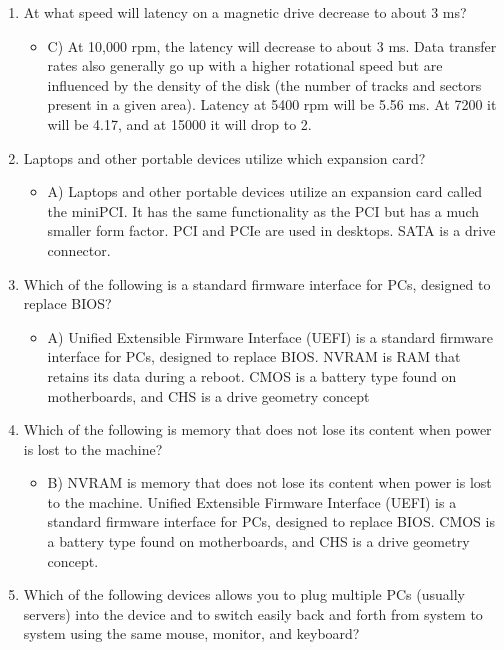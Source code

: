 \documentclass{article}
\begin{document}
\begin{enumerate}
\begin{itemize}
    \end{itemize}
    \item At what speed will latency on a magnetic drive decrease to about 3 ms?
    \begin{itemize}
        \item C) At 10,000 rpm, the latency will decrease to about 3 ms. Data transfer rates also generally go up with a higher rotational speed but are influenced by the density of the disk (the number of tracks and sectors present in a given area). Latency at 5400 rpm will be  5.56 ms. At 7200 it will be 4.17, and at 15000 it will drop to 2.
    \end{itemize}
    \item Laptops and other portable devices utilize which expansion card?
    \begin{itemize}
        \item A) Laptops and other portable devices utilize an expansion card called the miniPCI. It has the same functionality as the PCI but has a much smaller form factor. PCI and PCIe are used in desktops. SATA is a drive connector.
    \end{itemize}
    \item Which of the following is a standard firmware interface for PCs, designed to replace BIOS?
    \begin{itemize}
        \item A) Unified Extensible Firmware Interface (UEFI) is a standard firmware interface for PCs, designed to replace BIOS. NVRAM is RAM that retains its data during a reboot. CMOS is a battery type found on motherboards, and CHS is a drive geometry concept
    \end{itemize}
    \item Which of the following is memory that does not lose its content when power is lost to the
machine?
    \begin{itemize}
        \item  B) NVRAM is memory that does not lose its content when power is lost to the machine. Unified Extensible Firmware Interface (UEFI) is a standard firmware interface for PCs, designed to replace BIOS. CMOS is a battery type found on motherboards, and CHS is a drive geometry concept.
    \end{itemize}
    \item Which of the following devices allows you to plug multiple PCs (usually servers) into the
device and to switch easily back and forth from system to system using the same mouse,
monitor, and keyboard?

\end{enumerate}
\end{document}

